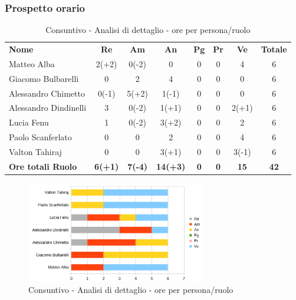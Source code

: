 \subsubsection{Prospetto orario}
	\begin{table} [h!]
	\begin{center}
		\begin{tabular} {m{3.5cm} c c c c c c c  }
			\rowcolor{lightgray}
			\textbf{Nome} & \textbf{Re} & \textbf{Am} & \textbf{An} & \textbf{Pg} & \textbf{Pr} & \textbf{Ve} & \textbf{Totale} \\
			Matteo Alba               & 2(+2) & 0(-2) & 0      & 0  & 0  & 4      & 6 \\
			Giacomo Bulbarelli        & 0     & 2     & 4      & 0  & 0  & 0      & 6 \\
			Alessandro Chimetto       & 0(-1) & 5(+2) & 1(-1)  & 0  & 0  & 0      & 6 \\
			Alessandro Dindinelli     & 3     & 0(-2) & 1(+1)  & 0  & 0  & 2(+1)  & 6 \\
			Lucia Fenu                & 1     & 0(-2) & 3(+2)  & 0  & 0  & 2      & 6 \\
			Paolo Scanferlato         & 0     & 0     & 2      & 0  & 0  & 4      & 6 \\
			Valton Tahiraj            & 0     & 0     & 3(+1)  & 0  & 0  & 3(-1)  & 6\\
			\textbf{Ore totali Ruolo} & \textbf{6(+1)} & \textbf{7(-4)} & \textbf{14(+3)} & \textbf{0}  & \textbf{0}  & \textbf{15}     & \textbf{42}
		\end{tabular}
		\caption{Consuntivo - Analisi di dettaglio - ore per persona/ruolo}
	\end{center}
\end{table}

	\begin{figure} [h!]
	\centering
	\includegraphics[width=0.7\textwidth]{res/img/grafici/consuntivo-barre- ore analisi dettaglio.png}
	\caption{Consuntivo - Analisi di dettaglio -  ore per persona/ruolo} 
\end{figure}

